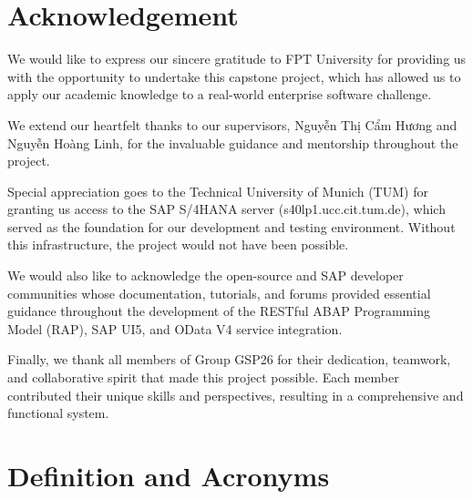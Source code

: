 \documentclass[12pt,a4paper]{report}
\begin{document}
\tableofcontents
\clearpage
\listoftables
\clearpage
\listoffigures
\clearpage
{}
\setcounter{page}{1}

\chapter*{Acknowledgement}

We would like to express our sincere gratitude to FPT University for providing us with the opportunity to undertake this capstone project, which has allowed us to apply our academic knowledge to a real-world enterprise software challenge.

We extend our heartfelt thanks to our supervisors, Nguyễn Thị Cẩm Hương and Nguyễn Hoàng Linh, for the invaluable guidance and mentorship throughout the project.

Special appreciation goes to the Technical University of Munich (TUM) for granting us access to the SAP S/4HANA server (s40lp1.ucc.cit.tum.de), which served as the foundation for our development and testing environment. Without this infrastructure, the project would not have been possible.

We would also like to acknowledge the open-source and SAP developer communities whose documentation, tutorials, and forums provided essential guidance throughout the development of the RESTful ABAP Programming Model (RAP), SAP UI5, and OData V4 service integration.

Finally, we thank all members of Group GSP26 for their dedication, teamwork, and collaborative spirit that made this project possible. Each member contributed their unique skills and perspectives, resulting in a comprehensive and functional system.

\clearpage
\chapter*{Definition and Acronyms}
\end{document}
